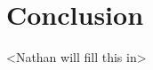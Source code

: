\documentclass{acm_proc_article-sp}
\begin{document}
\section{Conclusion}

<Nathan will fill this in>

%

%
%


\end{document}
